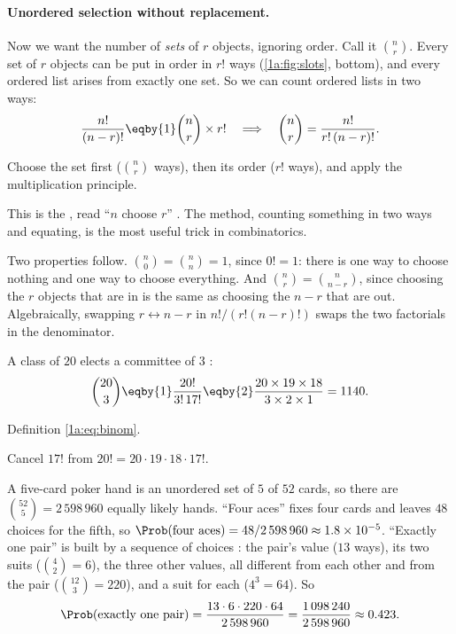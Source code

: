 \paragraph{Unordered selection without replacement.} Now we want the number of
\emph{sets} of $r$ objects, ignoring order. Call it $\binom nr$. Every set of $r$
objects can be put in order in $r!$ ways (\cref{1a:fig:slots}, bottom), and every
ordered list arises from exactly one set. So we can count ordered lists in two
ways:
\begin{align}
\frac{n!}{(n-r)!}\eqby{1}\binom nr\times r!
\quad\Longrightarrow\quad
\binom nr=\frac{n!}{r!\,(n-r)!}.
\label{1a:eq:binom}
\end{align}
\begin{explain}
  \item Choose the set first ($\binom nr$ ways), then its order ($r!$ ways), and
        apply the multiplication principle.
\end{explain}
This is the , read ``$n$ choose $r$''
. The method, counting something in two ways and
equating, is the most useful trick in combinatorics.

Two properties follow. $\binom n0=\binom nn=1$, since $0!=1$: there is one way
to choose nothing and one way to choose everything. And
$\binom nr=\binom n{n-r}$, since choosing the $r$ objects that are in is the same
as choosing the $n-r$ that are out. Algebraically, swapping $r\leftrightarrow n-r$
in $n!/(r!(n-r)!)$ swaps the two factorials in the denominator.

\label{1a:ex:committee}
A class of $20$ elects a committee of $3$ :
\begin{align*}
\binom{20}{3}\eqby{1}\frac{20!}{3!\,17!}\eqby{2}\frac{20\times19\times18}{3\times2\times1}=1140 .
\end{align*}
\begin{explain}
  \item Definition \eqref{1a:eq:binom}.
  \item Cancel $17!$ from $20!=20\cdot19\cdot18\cdot17!$.
\end{explain}
A five-card poker hand is an unordered set of $5$ of $52$ cards, so there are
$\binom{52}5=2\,598\,960$ equally likely hands. ``Four aces'' fixes four cards and
leaves $48$ choices for the fifth, so $\Prob(\text{four aces})=48/2\,598\,960\approx
1.8\times10^{-5}$. ``Exactly one pair'' is built by a sequence of choices
: the pair's value ($13$ ways), its two suits
($\binom42=6$), the three other values, all different from each other and from
the pair ($\binom{12}3=220$), and a suit for each ($4^3=64$). So
\[
\Prob(\text{exactly one pair})=\frac{13\cdot6\cdot220\cdot64}{2\,598\,960}
=\frac{1\,098\,240}{2\,598\,960}\approx0.423 .
\]

